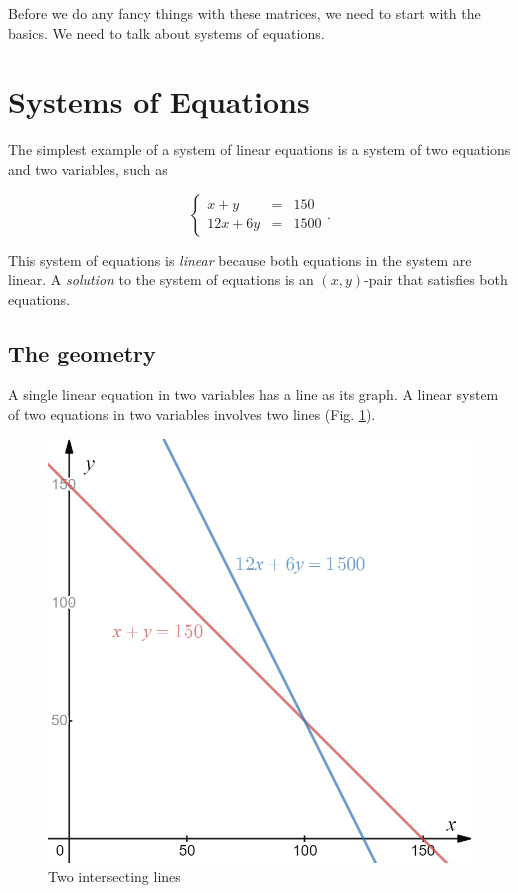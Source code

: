 \documentclass[
]{book}
\theoremstyle{definition}
\theoremstyle{definition}
\theoremstyle{definition}
\theoremstyle{definition}
\theoremstyle{remark}
\begin{document}
Before we do any fancy things with these matrices, we need to start with the basics. We need to talk about systems of equations.

\section{Systems of Equations}\label{systems-of-equations}

The simplest example of a system of linear equations is a system of two equations and two variables, such as

\begin{equation}
\left\{ 
\begin{array}{ccl}
x+y&=&150\\
    12x+6y&=&1500
\end{array}\right. .
\label{eq:2b2}
\end{equation}

This system of equations is \emph{linear} because both equations in the system are linear. A \emph{solution} to the system of equations is an \((x,y)\)-pair that satisfies both equations.

\subsection*{The geometry}\label{the-geometry}

A single linear equation in two variables has a line as its graph. A linear system of two equations in two variables involves two lines (Fig. \ref{fig:intersecting}).

\begin{figure}

{\centering \includegraphics[width=0.5\linewidth]{images/soe1} 

}

\caption{Two intersecting lines}\label{fig:intersecting}
\end{figure}
\end{document}
